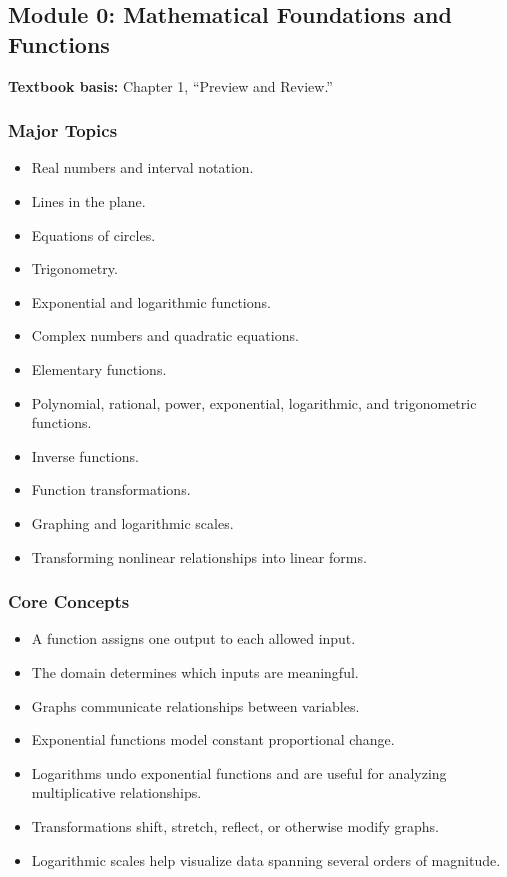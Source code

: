 \documentclass[11pt]{article}
\begin{document}
\subsection{Module 0: Mathematical Foundations and Functions}

\textbf{Textbook basis:} Chapter 1, ``Preview and Review.''

\subsubsection*{Major Topics}

\begin{itemize}
    \item Real numbers and interval notation.
    \item Lines in the plane.
    \item Equations of circles.
    \item Trigonometry.
    \item Exponential and logarithmic functions.
    \item Complex numbers and quadratic equations.
    \item Elementary functions.
    \item Polynomial, rational, power, exponential, logarithmic, and trigonometric functions.
    \item Inverse functions.
    \item Function transformations.
    \item Graphing and logarithmic scales.
    \item Transforming nonlinear relationships into linear forms.
\end{itemize}

\subsubsection*{Core Concepts}

\begin{itemize}
    \item A function assigns one output to each allowed input.
    \item The domain determines which inputs are meaningful.
    \item Graphs communicate relationships between variables.
    \item Exponential functions model constant proportional change.
    \item Logarithms undo exponential functions and are useful for analyzing multiplicative relationships.
    \item Transformations shift, stretch, reflect, or otherwise modify graphs.
    \item Logarithmic scales help visualize data spanning several orders of magnitude.
\end{itemize}
\end{document}
